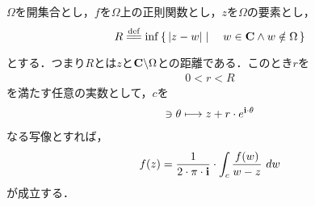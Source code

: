 	\begin{screen}
		\begin{thm}[円周上の積分公式]\label{thm:integral_formula_on_a_circle}
			$\Omega$を開集合とし，$f$を$\Omega$上の正則関数とし，$z$を$\Omega$の要素とし，
			\begin{align}
				R \defeq \inf{}{\Set{|z-w|}{w \in \C \wedge w \notin \Omega}}
			\end{align}
			とする．つまり$R$とは$z$と$\mathbf{C} \backslash \Omega$との距離である．このとき$r$を
			\begin{align}
				0 < r < R
			\end{align}
			を満たす任意の実数として，$c$を
			\begin{align}
				[0,2 \cdot \pi] \ni \theta \longmapsto z + r \cdot e^{\isym \cdot \theta}
			\end{align}
			なる写像とすれば，
			\begin{align}
				f(z) = \frac{1}{2 \cdot \pi \cdot \mathbf{i}} \cdot \int_{c} \frac{f(w)}{w - z}\ dw
			\end{align}
			が成立する．
		\end{thm}
	\end{screen}
	
